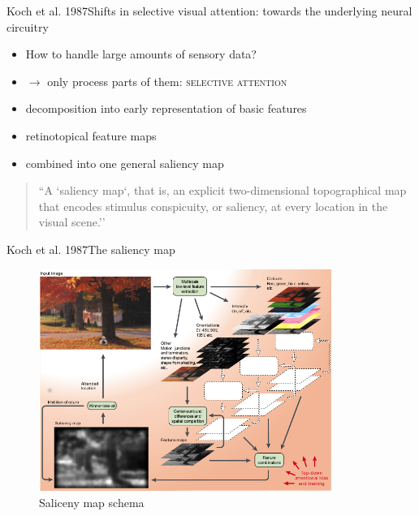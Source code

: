 \documentclass[compress,t]{beamer}
\begin{document}
\begin{frame}{Koch et al. 1987}{Shifts in selective visual attention: towards the underlying neural circuitry}
    \begin{itemize}
        \item How to handle large amounts of sensory data?
        \item $\rightarrow$ only process parts of them: \textsc{selective attention}
    \end{itemize}

    \pause

    \begin{itemize}
        \item decomposition into early representation of basic features
        \item retinotopical feature maps
        \item combined into one general saliency map
    \end{itemize}

    \pause

    \begin{quote}
        ``A `saliency map`, that is, an explicit two-dimensional topographical map that
        encodes stimulus conspicuity, or saliency, at every location in the visual
        scene.''\cite{itti2001}
    \end{quote}
\end{frame}

\begin{frame}{Koch et al. 1987}{The saliency map}
    \begin{figure}
        \includegraphics[width=0.85\textwidth]{graphics/koch-maps.jpg}
        \caption{Saliceny map schema}
        \label{fig:koch-schema}
    \end{figure}
\end{frame}
\end{document}
